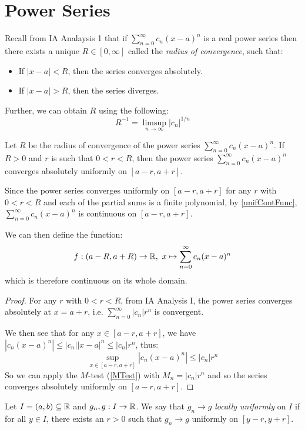\documentclass[../main.tex]{subfiles}
\begin{document}
\section{Power Series}
\begin{remark}[Recap]
  Recall from IA Analaysis 1 that if $\sum_{n = 0}^{\infty} c_n(x - a)^n$ is a real power series then there exists a unique $R \in [0, \infty]$ called the \textit{radius of convergence}, such that:
  \begin{itemize}
    \item If $|x - a| < R$, then the series converges absolutely.
    \item If $|x - a| > R$, then the series diverges.
  \end{itemize}
  Further, we can obtain $R$ using the following:
  \[
    R^{-1} = \limsup_{n \to \infty} |c_n|^{1/n}
  \]
\end{remark}
\begin{theorem}
  Let $R$ be the radius of convergence of the power series $\sum_{n = 0}^{\infty} c_n (x - a)^n$.
  If $R > 0$ and $r$ is such that $0 < r < R$, then the power series $\sum_{n = 0}^{\infty} c_n (x - a)^n$ converges absolutely uniformly on $[a - r, a + r]$. \label{powerConv}
\end{theorem}
\begin{remark}
  Since the power series converges uniformly on $[a - r, a + r]$ for any $r$ with $0 < r < R$ and each of the partial sums is a finite polynomial, by \cref{unifContFunc}, $\sum_{n = 0}^{\infty} c_n(x - a)^n$ is continuous on $[a - r, a + r]$.

  We can then define the function:
  \[
    f: (a - R, a + R) \to \mathbb{R},\ x \mapsto \sum_{n = 0}^{\infty} c_n(x - a)^n
  \]
  which is therefore continuous on its whole domain.
\end{remark}
\begin{proof}
  For any $r$ with $0 < r < R$, from IA Analysis I, the power series converges absolutely at $x = a + r$, i.e. $\sum_{n = 0}^{\infty} |c_n|r^n$ is convergent.

  We then see that for any $x \in [a - r, a + r]$, we have $|c_n(x - a)^n| \leq |c_n| |x - a|^n \leq |c_n| r^n$, thus:
  \[
    \sup_{x \in [a - r, a + r]} |c_n(x - a)^n| \leq |c_n| r^n
  \]
  So we can apply the $M$-test (\cref{MTest}) with $M_n = |c_n| r^n$ and so the series converges absolutely uniformly on $[a - r,  a + r]$.
\end{proof}
\begin{definition}
  Let $I = (a, b) \subseteq \mathbb{R}$ and $g_n, g: I \to \mathbb{R}$.
  We say that $g_n \to g$ \textit{locally uniformly} on $I$ if for all $y \in I$, there exists an $r > 0$ such that $g_n \to g$ uniformly on $[y - r, y + r]$.
\end{definition}
\end{document}
